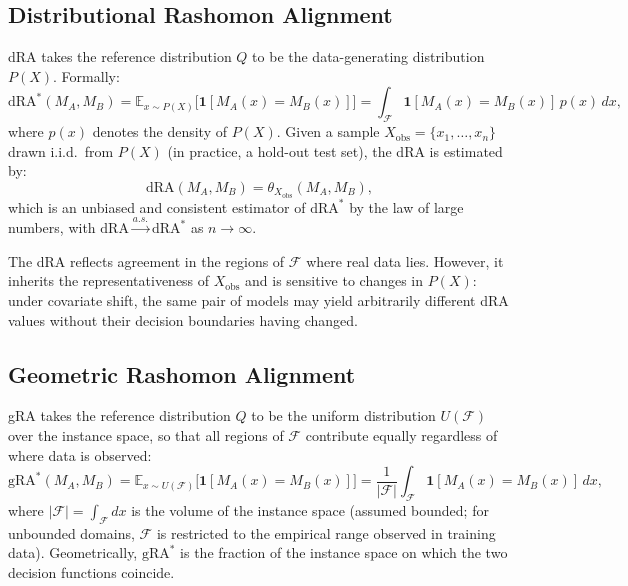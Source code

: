 \documentclass[runningheads]{llncs}
\begin{document}
\subsection{Distributional Rashomon Alignment}
\label{sec:dra}

dRA takes the reference distribution $Q$ to be the data-generating distribution $P(X)$. Formally:
\begin{equation}
  \label{eq:dra-pop}
  \mathrm{dRA}^*(M_A, M_B)
  = \mathbb{E}_{x \sim P(X)}\bigl[\mathbf{1}[M_A(x) = M_B(x)]\bigr]
  = \int_{\mathcal{F}} \mathbf{1}[M_A(x) = M_B(x)]\, p(x)\, dx,
\end{equation}
where $p(x)$ denotes the density of $P(X)$. Given a sample $X_\text{obs} = \{x_1, \ldots, x_n\}$ drawn i.i.d.\ from $P(X)$ (in practice, a hold-out test set), the dRA is estimated by:
\begin{equation}
  \label{eq:dra}
  \mathrm{dRA}(M_A, M_B) = \theta_{X_\text{obs}}(M_A, M_B),
\end{equation}
which is an unbiased and consistent estimator of $\mathrm{dRA}^*$ by the law of large numbers, with $\mathrm{dRA} \xrightarrow{a.s.} \mathrm{dRA}^*$ as $n \to \infty$.

The dRA reflects agreement in the regions of $\mathcal{F}$ where real data lies. However, it inherits the representativeness of $X_\text{obs}$ and is sensitive to changes in $P(X)$: under covariate shift, the same pair of models may yield arbitrarily different dRA values without their decision boundaries having changed.

\subsection{Geometric Rashomon Alignment}
\label{sec:gra}

gRA takes the reference distribution $Q$ to be the uniform distribution $U(\mathcal{F})$ over the instance space, so that all regions of $\mathcal{F}$ contribute equally regardless of where data is observed:
\begin{equation}
  \label{eq:gra-pop}
  \mathrm{gRA}^*(M_A, M_B)
  = \mathbb{E}_{x \sim U(\mathcal{F})}\bigl[\mathbf{1}[M_A(x) = M_B(x)]\bigr]
  = \frac{1}{|\mathcal{F}|} \int_{\mathcal{F}} \mathbf{1}[M_A(x) = M_B(x)]\, dx,
\end{equation}
where $|\mathcal{F}| = \int_\mathcal{F} dx$ is the volume of the instance space (assumed bounded; for unbounded domains, $\mathcal{F}$ is restricted to the empirical range observed in training data). Geometrically, $\mathrm{gRA}^*$ is the fraction of the instance space on which the two decision functions coincide.
\end{document}
